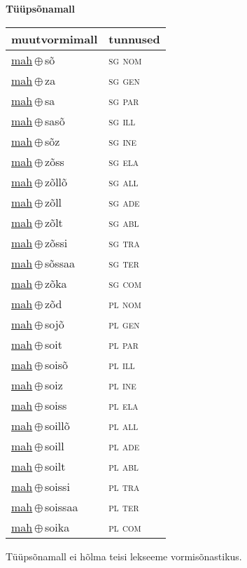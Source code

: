 

\vspace{3.5em}
\noindent \begin{minipage}{\textwidth}
\noindent \textbf{Tüüpsõnamall \,}\\

\begin{sideways}
\begin{tabular}{l l}
muutvormimall & tunnused \\
\hline
\underline{mah}\,$\oplus$\,sõ & \textsc{ sg nom } \\
\underline{mah}\,$\oplus$\,za & \textsc{ sg gen } \\
\underline{mah}\,$\oplus$\,sa & \textsc{ sg par } \\
\underline{mah}\,$\oplus$\,sasõ & \textsc{ sg ill } \\
\underline{mah}\,$\oplus$\,sõz & \textsc{ sg ine } \\
\underline{mah}\,$\oplus$\,zõss & \textsc{ sg ela } \\
\underline{mah}\,$\oplus$\,zõllõ & \textsc{ sg all } \\
\underline{mah}\,$\oplus$\,zõll & \textsc{ sg ade } \\
\underline{mah}\,$\oplus$\,zõlt & \textsc{ sg abl } \\
\underline{mah}\,$\oplus$\,zõssi & \textsc{ sg tra } \\
\underline{mah}\,$\oplus$\,sõssaa & \textsc{ sg ter } \\
\underline{mah}\,$\oplus$\,zõka & \textsc{ sg com } \\
\underline{mah}\,$\oplus$\,zõd & \textsc{ pl nom } \\
\underline{mah}\,$\oplus$\,sojõ & \textsc{ pl gen } \\
\underline{mah}\,$\oplus$\,soit & \textsc{ pl par } \\
\underline{mah}\,$\oplus$\,soisõ & \textsc{ pl ill } \\
\underline{mah}\,$\oplus$\,soiz & \textsc{ pl ine } \\
\underline{mah}\,$\oplus$\,soiss & \textsc{ pl ela } \\
\underline{mah}\,$\oplus$\,soillõ & \textsc{ pl all } \\
\underline{mah}\,$\oplus$\,soill & \textsc{ pl ade } \\
\underline{mah}\,$\oplus$\,soilt & \textsc{ pl abl } \\
\underline{mah}\,$\oplus$\,soissi & \textsc{ pl tra } \\
\underline{mah}\,$\oplus$\,soissaa & \textsc{ pl ter } \\
\underline{mah}\,$\oplus$\,soika & \textsc{ pl com } \\
\end{tabular}
\end{sideways}
\label{tab:tüüpsõnamall-mahsõ}

\end{minipage}

 
\vspace{1em}
\noindent Tüüpsõnamall  ei hõlma teisi lekseeme vormi\-sõnastikus.
